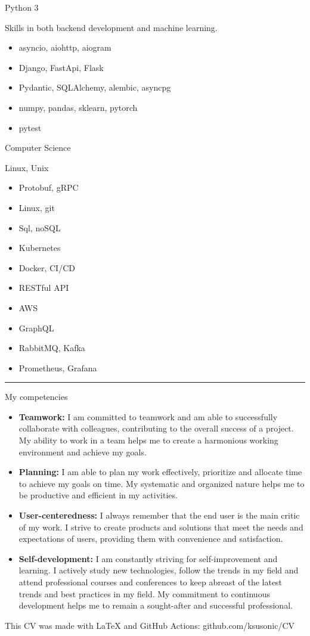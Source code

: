 \documentclass[a4paper,10pt]{article}
\newlength{\cvcolumngapwidth}
\newlength{\cvleftcolumnwidth}
\newlength{\cvrightcolumnwidth}
\newcommand{\cvsectionstyle}[1]{{\normalsize\cvsectionfont\textcolor{cvsectioncolor}{#1}}}
\newcommand{\cvheadingstyle}[1]{{\normalsize\cvheadingfont\textcolor{cvheadingcolor}{#1}}}
\newlength{\cvafteritemskipamount}
\newlength{\cvaftersectionskipamount}
\newlength{\cvbetweensectionandheadingextraskipamount}
\newlength{\cvparskip}
\newcommand{\cvsection}[1]{
    \begin{minipage}[t]{\cvleftcolumnwidth}
        \raggedleft\cvsectionstyle{#1}
    \end{minipage}%
    \hspace{\cvcolumngapwidth}%
    \begin{minipage}[t]{\cvrightcolumnwidth}
        \textcolor{cvrulecolor}{\rule{\cvrightcolumnwidth}{0.3mm}}
    \end{minipage}

    \vspace{\cvaftersectionskipamount}
}
\newcommand{\cvitem}[2]{
    \begin{minipage}[t]{\cvleftcolumnwidth}
        \raggedleft #1
    \end{minipage}%
    \hspace{\cvcolumngapwidth}%
    \begin{minipage}[t]{\cvrightcolumnwidth}
        \setlength{\parskip}{\cvparskip} #2
    \end{minipage}

    \vspace{\cvafteritemskipamount}
}
\begin{document}
\cvitem{
    \cvheadingstyle{Python 3}
}{
    Skills in both backend development and machine learning.
    \begin{itemize}
        \item asyncio, aiohttp, aiogram
        \item Django, FastApi, Flask
        \item Pydantic, SQLAlchemy, alembic, asyncpg
        \item numpy, pandas, sklearn, pytorch
        \item pytest
    \end{itemize}
}

\cvitem{
    \cvheadingstyle{Computer Science}
}{
    Linux, Unix
    \begin{itemize}
        \item Protobuf, gRPC
        \item Linux, git
        \item Sql, noSQL
        \item Kubernetes
        \item Docker, CI/CD
        \item RESTful API
        \item AWS
        \item GraphQL
        \item RabbitMQ, Kafka
        \item Prometheus, Grafana
    \end{itemize}
}



\cvsection{}

\vspace{\cvbetweensectionandheadingextraskipamount}

\cvitem{
    \cvheadingstyle{My competencies}
}{
    \begin{itemize}[leftmargin=0.5cm, label={}]
        \item {\textbf{Teamwork:} I am committed to teamwork and am able to successfully collaborate with colleagues, contributing to the overall success of a project. My ability to work in a team helps me to create a harmonious working environment and achieve my goals.}
        \item {\textbf{Planning:} I am able to plan my work effectively, prioritize and allocate time to achieve my goals on time. My systematic and organized nature helps me to be productive and efficient in my activities.}
        \item {\textbf{User-centeredness:} I always remember that the end user is the main critic of my work. I strive to create products and solutions that meet the needs and expectations of users, providing them with convenience and satisfaction.}
        \item {\textbf{Self-development:} I am constantly striving for self-improvement and learning. I actively study new technologies, follow the trends in my field and attend professional courses and conferences to keep abreast of the latest trends and best practices in my field. My commitment to continuous development helps me to remain a sought-after and successful professional.}
    \end{itemize}
}

This CV was made with LaTeX and GitHub Actions: github.com/ksusonic/CV
\end{document}
